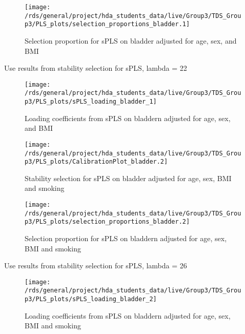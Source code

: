 \documentclass[
]{article}
\begin{document}
\begin{figure}
\texttt{[image: /rds/general/project/hda\_students\_data/live/Group3/TDS\_Group3/PLS\_plots/selection\_proportions\_bladder.1]} \caption{Selection proportion for sPLS on bladder adjusted for age, sex, and BMI}\label{fig:selection proportion on bladder.1}
\end{figure}

Use results from stability selection for sPLS, lambda = 22

\begin{figure}
\texttt{[image: /rds/general/project/hda\_students\_data/live/Group3/TDS\_Group3/PLS\_plots/sPLS\_loading\_bladder\_1]} \caption{Loading coefficients from sPLS on bladdern adjusted for age, sex, and BMI}\label{fig:loading coefficients in bladder.1}
\end{figure}

\begin{figure}
\texttt{[image: /rds/general/project/hda\_students\_data/live/Group3/TDS\_Group3/PLS\_plots/CalibrationPlot\_bladder.2]} \caption{Stability selection for sPLS on bladder adjusted for age, sex, BMI and smoking}\label{fig:stability selection on bladder.2}
\end{figure}

\begin{figure}
\texttt{[image: /rds/general/project/hda\_students\_data/live/Group3/TDS\_Group3/PLS\_plots/selection\_proportions\_bladder.2]} \caption{Selection proportion for sPLS on bladdern adjusted for age, sex, BMI and smoking}\label{fig:selection proportion on bladder.2}
\end{figure}

Use results from stability selection for sPLS, lambda = 26

\begin{figure}
\texttt{[image: /rds/general/project/hda\_students\_data/live/Group3/TDS\_Group3/PLS\_plots/sPLS\_loading\_bladder\_2]} \caption{Loading coefficients from sPLS on bladdern adjusted for age, sex, BMI and smoking}\label{fig:loading coefficients in bladder.2}
\end{figure}
\end{document}
